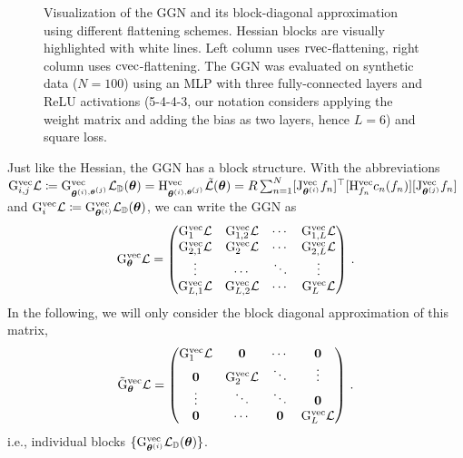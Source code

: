 \begin{figure}
\begin{minipage}[t]{0.495\linewidth}
  \end{minipage}
  \caption{Visualization of the GGN and its block-diagonal approximation using different flattening schemes.
    Hessian blocks are visually highlighted with white lines.
    Left column uses $\operatorname{rvec}$-flattening, right column uses $\operatorname{cvec}$-flattening.
    The GGN was evaluated on synthetic data ($N=100$) using an MLP with three fully-connected layers and ReLU activations (5-4-4-3, our notation considers applying the weight matrix and adding the bias as two layers, hence $L=6$) and square loss.
  }
\end{figure}

\switchcolumn[0]
Just like the Hessian, the GGN has a block structure. With the abbreviations
$\mathrm{G}_{i,j}^{\operatorname{vec}}{\mathcal{L}} \coloneq \mathrm{G}^{\operatorname{vec}}_{{\bm{\theta}}^{(i), {\bm{\theta}}^{(j)}}} {\mathcal{L}}_{{\mathbb{D}}}({\bm{\theta}}) = \mathrm{H}^{\operatorname{vec}}_{{\bm{\theta}}^{(i), {\bm{\theta}}^{(j)}}} \tilde{{\mathcal{L}}}({\bm{\theta}}) = R \sum_{n=1}^N [\mathrm{J}_{{\bm{\theta}}^{(i)}}^{\operatorname{vec}} f_n]^{\top} [\mathrm{H}^{\operatorname{vec}}_{f_n} c_n(f_n)] [\mathrm{J}_{{\bm{\theta}}^{(j)}}^{\operatorname{vec}} f_n]$ and $\mathrm{G}_{i}^{\operatorname{vec}}{\mathcal{L}} \coloneq \mathrm{G}^{\operatorname{vec}}_{{\bm{\theta}}^{(i)}} {\mathcal{L}}_{{\mathbb{D}}}({\bm{\theta}})$, we can write the GGN as
\begin{align*}
  \mathrm{G}_{{\bm{\theta}}}^{\operatorname{vec}} {\mathcal{L}}
  =
  \begin{pmatrix}
    \mathrm{G}_1^{\operatorname{vec}} {\mathcal{L}}
    &
      \mathrm{G}_{1, 2}^{\operatorname{vec}} {\mathcal{L}}
    &
      \cdots
    &
      \mathrm{G}_{1, L}^{\operatorname{vec}} {\mathcal{L}}
    \\
    \mathrm{G}_{2, 1}^{\operatorname{vec}} {\mathcal{L}}
    &
      \mathrm{G}_2^{\operatorname{vec}} {\mathcal{L}}
    &
      \cdots
    &
      \mathrm{G}_{2, L}^{\operatorname{vec}} {\mathcal{L}}
    \\
    \vdots & \cdots & \ddots & \vdots
    \\
    \mathrm{G}_{L, 1}^{\operatorname{vec}} {\mathcal{L}}
    &
      \mathrm{G}_{L, 2}^{\operatorname{vec}} {\mathcal{L}}
    &
      \cdots
    &
      \mathrm{G}_L^{\operatorname{vec}} {\mathcal{L}}
  \end{pmatrix}\,.
\end{align*}
In the following, we will only consider the block diagonal approximation of this matrix,
\begin{align*}
  \tilde{\mathrm{G}}_{{\bm{\theta}}}^{\operatorname{vec}} {\mathcal{L}}
  =
  \begin{pmatrix}
    \mathrm{G}_1^{\operatorname{vec}} {\mathcal{L}} & {\bm{0}} & \cdots & {\bm{0}}
    \\
    {\bm{0}} & \mathrm{G}_2^{\operatorname{vec}} {\mathcal{L}} & \ddots & \vdots
    \\
    \vdots & \ddots & \ddots & {\bm{0}}
    \\
    {\bm{0}} & \cdots & {\bm{0}} & \mathrm{G}_L^{\operatorname{vec}} {\mathcal{L}}
  \end{pmatrix}\,.
\end{align*}
i.e., individual blocks $\{ \mathrm{G}_{{\bm{\theta}}^{(i)}}^{\operatorname{vec}} {\mathcal{L}}_{{\mathbb{D}}}({\bm{\theta}})\}$.

